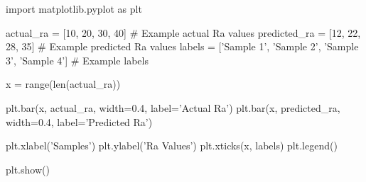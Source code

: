 import matplotlib.pyplot as plt

actual_ra = [10, 20, 30, 40]  # Example actual Ra values
predicted_ra = [12, 22, 28, 35]  # Example predicted Ra values
labels = ['Sample 1', 'Sample 2', 'Sample 3', 'Sample 4']  # Example labels

x = range(len(actual_ra))

plt.bar(x, actual_ra, width=0.4, label='Actual Ra')
plt.bar(x, predicted_ra, width=0.4, label='Predicted Ra')

plt.xlabel('Samples')
plt.ylabel('Ra Values')
plt.xticks(x, labels)
plt.legend()

plt.show()
